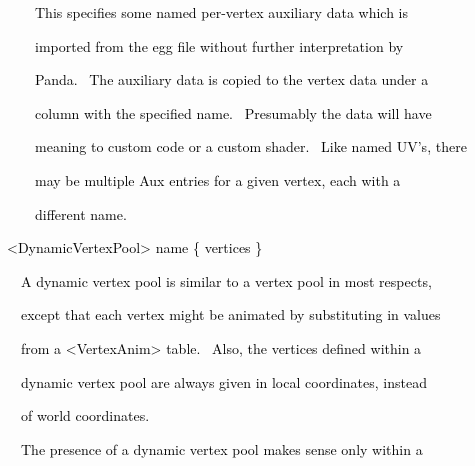 \documentclass[a4paper]{article}
\newcommand\textstyleOOoComputerKeyWord[1]{\textrm{\textcolor[rgb]{0.0,0.0,0.5019608}{#1}}}
\begin{document}
{\color{black}
\textstyleOOoComputerKeyWord{\textcolor{black}{\ \ \ \ This specifies some named per-vertex auxiliary data which is}}}

{\color{black}
\textstyleOOoComputerKeyWord{\textcolor{black}{\ \ \ \ imported from the egg file without further interpretation by}}}

{\color{black}
\textstyleOOoComputerKeyWord{\textcolor{black}{\ \ \ \ Panda. \ The auxiliary data is copied to the vertex data under
a}}}

{\color{black}
\textstyleOOoComputerKeyWord{\textcolor{black}{\ \ \ \ column with the specified name. \ Presumably the data will
have}}}

{\color{black}
\textstyleOOoComputerKeyWord{\textcolor{black}{\ \ \ \ meaning to custom code or a custom shader. \ Like named UV's,
there}}}

{\color{black}
\textstyleOOoComputerKeyWord{\textcolor{black}{\ \ \ \ may be multiple Aux entries for a given vertex, each with a}}}

{\color{black}
\textstyleOOoComputerKeyWord{\textcolor{black}{\ \ \ \ different name.}}}


\bigskip


\bigskip


\bigskip

{\color{black}
\textstyleOOoComputerKeyWord{\textcolor{black}{{\textless}DynamicVertexPool{\textgreater} name \{ vertices \}}}}


\bigskip

{\color{black}
\textstyleOOoComputerKeyWord{\textcolor{black}{\ \ A dynamic vertex pool is similar to a vertex pool in most
respects,}}}

{\color{black}
\textstyleOOoComputerKeyWord{\textcolor{black}{\ \ except that each vertex might be animated by substituting in
values}}}

{\color{black}
\textstyleOOoComputerKeyWord{\textcolor{black}{\ \ from a {\textless}VertexAnim{\textgreater} table. \ Also, the
vertices defined within a}}}

{\color{black}
\textstyleOOoComputerKeyWord{\textcolor{black}{\ \ dynamic vertex pool are always given in local coordinates, instead}}}

{\color{black}
\textstyleOOoComputerKeyWord{\textcolor{black}{\ \ of world coordinates.}}}


\bigskip

{\color{black}
\textstyleOOoComputerKeyWord{\textcolor{black}{\ \ The presence of a dynamic vertex pool makes sense only within a}}}
\end{document}

